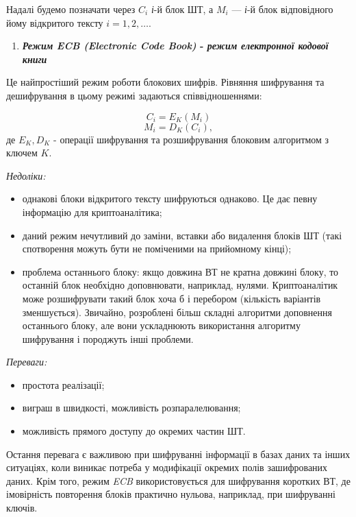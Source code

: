 Надалі будемо позначати через  $C_i$ \textit{і}{}-й блок ШТ, а 
$M_i$ --- \textit{і}{}-й блок відповідного йому відкритого тексту 
$i=1,2,\dots$.


\bigskip


\bigskip

\liststyleWWviiiNumxxi
\begin{enumerate}
\item {\centering\bfseries
\textit{Режим }\textit{ECB (Electronic Code Book) }{}- \textit{режим електронної
кодової книги}
\par}
\end{enumerate}

\bigskip

Це найпростіший режим роботи блокових шифрів. Рівняння шифрування та
дешифрування в цьому режимі  задаються співвідношеннями:

\begin{equation*}
{C_{i}=E_{K}(M_{i})}
\end{equation*}
\begin{equation*}
{M_{i}=D_{K}(C_{i}),}
\end{equation*}
де  $E_{K},D_K$ - операції шифрування та розшифрування блоковим
алгоритмом з ключем  $K$.

{\itshape
Недоліки:}

\liststyleWWviiiNumxv
\begin{itemize}
\item однакові блоки відкритого тексту шифруються однаково. Це дає певну
інформацію для криптоаналітика;
\item даний режим нечутливий до заміни, вставки або видалення блоків ШТ (такі
спотворення можуть бути не поміченими на прийомному кінці);
\item проблема останнього блоку: якщо довжина ВТ не кратна довжині блоку, то
останній блок необхідно доповнювати, наприклад, нулями. Криптоаналітик може
розшифрувати такий блок хоча б і перебором (кількість варіантів зменшується).
Звичайно, розроблені більш складні алгоритми доповнення останнього блоку, але
вони ускладнюють використання алгоритму шифрування і породжуть інші проблеми.
\end{itemize}
{\itshape
Переваги:}

\liststyleWWviiiNumliv
\begin{itemize}
\item простота реалізації;
\item виграш в швидкості, можливість розпаралелювання;
\item можливість прямого доступу до окремих частин ШТ.
\end{itemize}
Остання перевага є важливою при шифруванні інформації в базах даних та інших
ситуаціях, коли виникає потреба у модифікації окремих полів зашифрованих даних.
Крім того, режим \textit{ECB} використовується для шифрування коротких ВТ, де
імовірність повторення блоків практично нульова, наприклад, при шифруванні
ключів.

